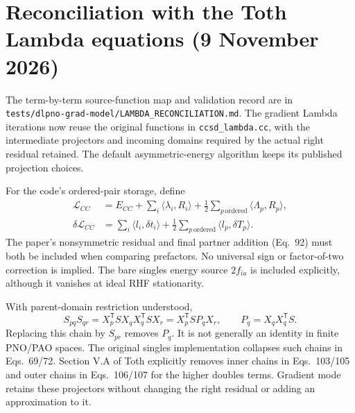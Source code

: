 \documentclass[11pt]{article}
\newcommand{\T}{^{\mathsf T}}
\newcommand{\ip}[2]{\langle #1,#2\rangle}
\begin{document}
\section{Reconciliation with the Toth Lambda equations (9 November 2026)}
The term-by-term source-function map and validation record are in
\texttt{tests/dlpno-grad-model/LAMBDA\_RECONCILIATION.md}.
The gradient Lambda iterations now reuse the original functions in
\texttt{ccsd\_lambda.cc}, with the intermediate projectors and incoming
domains required by the actual right residual retained. The default
asymmetric-energy algorithm keeps its published projection choices.

For the code's ordered-pair storage, define
\begin{align}
 \mathcal L_{CC}&=E_{CC}+\sum_i\ip{\lambda_i}{R_i}
     +\tfrac12\sum_{p\,\mathrm{ordered}}\ip{\Lambda_p}{R_p},\\
 \delta\mathcal L_{CC}&=\sum_i\ip{l_i}{\delta t_i}
     +\tfrac12\sum_{p\,\mathrm{ordered}}\ip{l_p}{\delta T_p}.
\end{align}
The paper's nonsymmetric residual and final partner addition (Eq.~92)
must both be included when comparing prefactors. No universal sign or
factor-of-two correction is implied. The bare singles energy source
$2f_{ia}$ is included explicitly, although it vanishes at ideal RHF
stationarity.

With parent-domain restriction understood,
\begin{equation}
 S_{pq}S_{qr}=X_p\T S X_qX_q\T S X_r
            =X_p\T S P_q X_r,\qquad P_q=X_qX_q\T S.
\end{equation}
Replacing this chain by $S_{pr}$ removes $P_q$. It is not generally an
identity in finite PNO/PAO spaces. The original singles implementation
collapses such chains in Eqs.~69/72. Section V.A of Toth explicitly removes
inner chains in Eqs.~103/105 and outer chains in Eqs.~106/107 for the
higher doubles terms. Gradient mode retains these projectors without
changing the right residual or adding an approximation to it.
\end{document}
